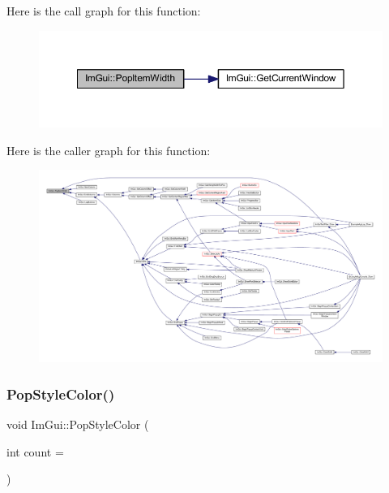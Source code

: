 Here is the call graph for this function\+:
\nopagebreak
\begin{figure}[H]
\begin{center}
\leavevmode
\includegraphics[width=350pt]{namespace_im_gui_ad29a3fc0cb5dfc7f9fc7224512ce90bf_cgraph}
\end{center}
\end{figure}
Here is the caller graph for this function\+:
\nopagebreak
\begin{figure}[H]
\begin{center}
\leavevmode
\includegraphics[width=350pt]{namespace_im_gui_ad29a3fc0cb5dfc7f9fc7224512ce90bf_icgraph}
\end{center}
\end{figure}
\mbox{\label{namespace_im_gui_a9795f730b4043a98b6254738d86efcdc}} 
\subsubsection{\texorpdfstring{Pop\+Style\+Color()}{PopStyleColor()}}
{\footnotesize\ttfamily void Im\+Gui\+::\+Pop\+Style\+Color (\begin{DoxyParamCaption}\item[{int}]{count = {} }\end{DoxyParamCaption})}

